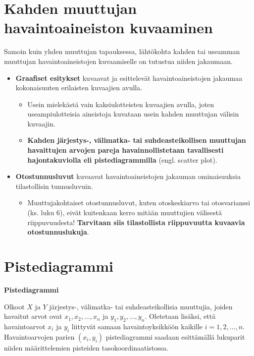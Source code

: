 \documentclass[
]{report}
\providecommand{\tightlist}{%
  \setlength{\itemsep}{0pt}\setlength{\parskip}{0pt}}\usepackage{longtable,booktabs,array}
\begin{document}
\hypertarget{kahden-muuttujan-havaintoaineiston-kuvaaminen}{%
\section{Kahden muuttujan havaintoaineiston
kuvaaminen}\label{kahden-muuttujan-havaintoaineiston-kuvaaminen}}

Samoin kuin yhden muuttujan tapauksessa, lähtökohta kahden tai useamman
muuttujan havaintoaineistojen kuvaamiselle on tutustua niiden jakaumaan.

\begin{itemize}
\item
  \textbf{Graafiset esitykset} kuvaavat ja esittelevät
  havaintoaineistojen jakaumaa kokonaisuuten erilaisten kuvaajien
  avulla.

  \begin{itemize}
  \item
    Usein mielekästä vain kaksiulotteisten kuvaajien avulla, joten
    useampiulotteisia aineistoja kuvataan usein kahden muuttujan välisin
    kuvaajin.
  \item
    \textbf{Kahden järjestys-, välimatka- tai suhdeasteikollisen
    muuttujan havaittujen arvojen pareja havainnollistetaan tavallisesti
    hajontakuviolla eli pistediagrammilla} (engl. scatter plot).
  \end{itemize}
\end{itemize}

\begin{itemize}
\item
  \textbf{Otostunnusluvut} kuvaavat havaintoaineistojen jakauman
  ominaisuuksia tilastollisin tunnusluvuin.

  \begin{itemize}
  \tightlist
  \item
    Muuttujakohtaiset otostunnusluvut, kuten otoskeskiarvo tai
    otosvarianssi (ks. luku 6), eivät kuitenkaan kerro mitään muuttujien
    välisestä riippuvuudesta! \textbf{Tarvitaan siis tilastollista
    riippuvuutta kuvaavia otostunnuslukuja}.
  \end{itemize}
\end{itemize}

\hypertarget{pistediagrammi}{%
\section{Pistediagrammi}\label{pistediagrammi}}

\begin{defblock}{}
\textbf{Pistediagrammi}

Olkoot \(X\) ja \(Y\) järjestys-, välimatka- tai suhdeasteikollisia
muuttujia, joiden havaitut arvot ovat \(x_1, x_2,\dots,x_n\) ja
\(y_1,y_2,\dots,y_n\). Oletetaan lisäksi, että havaintoarvot \(x_i\) ja
\(y_i\) liittyvät samaan havaintoyksikköön kaikille \(i=1,2,\dots,n\).
Havaintoarvojen parien \((x_i,y_i)\) pistediagrammi saadaan esittämällä
lukuparit niiden määrittelemien pisteiden tasokoordinaatistossa.

\end{defblock}
\end{document}
